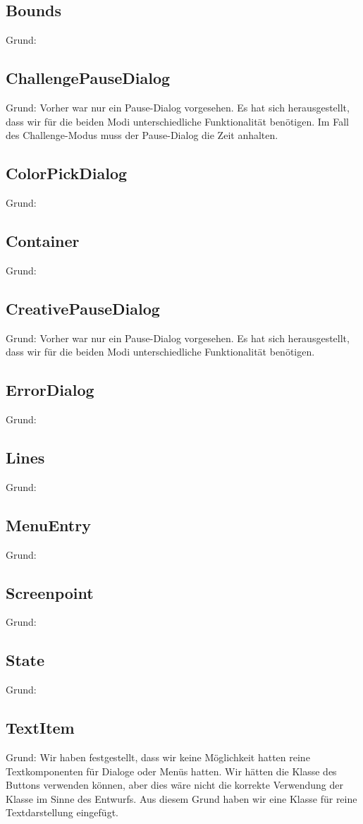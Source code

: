 \subsection{Bounds}
Grund:
\subsection{ChallengePauseDialog}
Grund: Vorher war nur ein Pause-Dialog vorgesehen. Es hat sich herausgestellt, dass wir für die beiden Modi unterschiedliche Funktionalität benötigen. Im Fall des Challenge-Modus muss der Pause-Dialog die Zeit anhalten.
\subsection{ColorPickDialog}
Grund:
\subsection{Container}
Grund:
\subsection{CreativePauseDialog}
Grund: Vorher war nur ein Pause-Dialog vorgesehen. Es hat sich herausgestellt, dass wir für die beiden Modi unterschiedliche Funktionalität benötigen.
\subsection{ErrorDialog}
Grund:
\subsection{Lines}
Grund:
\subsection{MenuEntry}
Grund:
\subsection{Screenpoint}
Grund:
\subsection{State}
Grund:
\subsection{TextItem}
Grund: Wir haben festgestellt, dass wir keine Möglichkeit hatten reine Textkomponenten für Dialoge oder Menüs hatten. Wir hätten die Klasse des Buttons verwenden können, aber dies wäre nicht die korrekte Verwendung der Klasse im Sinne des Entwurfs. Aus diesem Grund haben wir eine Klasse für reine Textdarstellung eingefügt.

